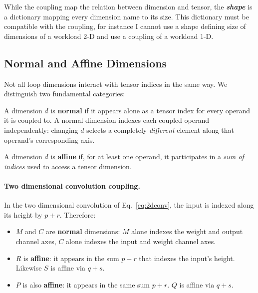While the coupling map the relation between dimension and tensor, the \textit{\textbf{shape}} 
is a dictionary mapping every dimension name to its size.
This dictionary must be compatible with the coupling, for instance I cannot
use a shape defining size of dimensions of a workload 2-D and use a coupling 
of a workload 1-D.


\subsection{Normal and Affine Dimensions}
\label{sec:normal-affine}

Not all loop dimensions interact with tensor indices in the same way.
We distinguish two fundamental categories:

\label{def:normal-dim}
A dimension $d$ is \textbf{normal} if it appears alone as a tensor index
for every operand it is coupled to.
A normal dimension indexes each coupled operand independently: changing
$d$ selects a completely \emph{different} element along that operand's
corresponding axis.

\label{def:affine-dim}
A dimension $d$ is \textbf{affine} if, for at least one operand, it
participates in a \emph{sum of indices} used to access a tensor
dimension.

\paragraph{Two dimensional convolution coupling.}
In the two dimensional convolution of Eq.~\eqref{eq:2dconv}, the input
is indexed along its height by $p + r$.
Therefore:
\begin{itemize}
  \item $M$ and $C$ are \textbf{normal} dimensions: $M$ alone
    indexes the weight and output channel axes, $C$ alone indexes the
    input and weight channel axes.
  \item $R$ is \textbf{affine}: it appears in the sum $p + r$ that
    indexes the input's height.
    Likewise $S$ is affine via $q + s$.
  \item $P$ is also \textbf{affine}: it appears in the same sum $p + r$.
    $Q$ is affine via $q + s$.
\end{itemize}

